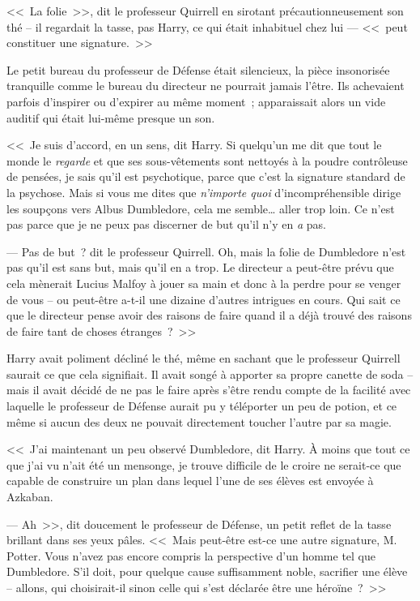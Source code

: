 <<~La folie~>>, dit le professeur Quirrell en sirotant précautionneusement son thé -- il regardait la tasse, pas Harry, ce qui était inhabituel chez lui — <<~peut constituer une signature.~>>

Le petit bureau du professeur de Défense était silencieux, la pièce insonorisée tranquille comme le bureau du directeur ne pourrait jamais l'être. Ils achevaient parfois d'inspirer ou d'expirer au même moment~; apparaissait alors un vide auditif qui était lui-même presque un son.

<<~Je suis d'accord, en un sens, dit Harry. Si quelqu'un me dit que tout le monde le \emph{regarde} et que ses sous-vêtements sont nettoyés à la poudre contrôleuse de pensées, je sais qu'il est psychotique, parce que c'est la signature standard de la psychose. Mais si vous me dites que \emph{n'importe quoi} d'incompréhensible dirige les soupçons vers Albus Dumbledore, cela me semble… aller trop loin. Ce n'est pas parce que je ne peux pas discerner de but qu'il n'y en \emph{a} pas.

--- Pas de but~? dit le professeur Quirrell. Oh, mais la folie de Dumbledore n'est pas qu'il est sans but, mais qu'il en a trop. Le directeur a peut-être prévu que cela mènerait Lucius Malfoy à jouer sa main et donc à la perdre pour se venger de vous -- ou peut-être a-t-il une dizaine d'autres intrigues en cours. Qui sait ce que le directeur pense avoir des raisons de faire quand il a déjà trouvé des raisons de faire tant de choses étranges~?~>>

Harry avait poliment décliné le thé, même en sachant que le professeur Quirrell saurait ce que cela signifiait. Il avait songé à apporter sa propre canette de soda -- mais il avait décidé de ne pas le faire après s'être rendu compte de la facilité avec laquelle le professeur de Défense aurait pu y téléporter un peu de potion, et ce même si aucun des deux ne pouvait directement toucher l'autre par sa magie.

<<~J'ai maintenant un peu observé Dumbledore, dit Harry. À moins que tout ce que j'ai vu n'ait été un mensonge, je trouve difficile de le croire ne serait-ce que capable de construire un plan dans lequel l'une de ses élèves est envoyée à Azkaban.

--- Ah~>>, dit doucement le professeur de Défense, un petit reflet de la tasse brillant dans ses yeux pâles. <<~Mais peut-être est-ce une autre signature, M. Potter. Vous n'avez pas encore compris la perspective d'un homme tel que Dumbledore. S'il doit, pour quelque cause suffisamment noble, sacrifier une élève -- allons, qui choisirait-il sinon celle qui s'est déclarée être une héroïne~?~>>

